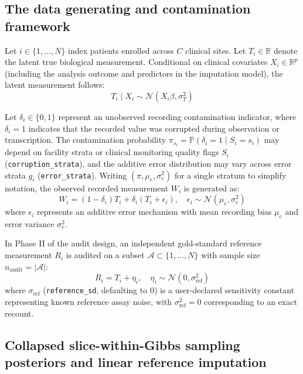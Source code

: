 \documentclass[
]{article}
\begin{document}
\subsection{The data generating and contamination
framework}\label{the-data-generating-and-contamination-framework}

Let \(i \in \{1, \dots, N\}\) index patients enrolled across \(C\)
clinical sites. Let \(T_i \in \mathbb{R}\) denote the latent true
biological measurement. Conditional on clinical covariates
\(X_i \in \mathbb{R}^p\) (including the analysis outcome and predictors
in the imputation model), the latent measurement follows:
\[T_i \mid X_i \sim \mathcal{N}(X_i \beta, \sigma_T^2)\]

Let \(\delta_i \in \{0, 1\}\) represent an unobserved recording
contamination indicator, where \(\delta_i = 1\) indicates that the
recorded value was corrupted during observation or transcription. The
contamination probability
\(\pi_{s_i} = \mathbb{P}(\delta_i = 1 \mid S_i = s_i)\) may depend on
facility strata or clinical monitoring quality flags \(S_i\)
(\texttt{corruption\_strata}), and the additive error distribution may
vary across error strata \(g_i\) (\texttt{error\_strata}). Writing
\((\pi, \mu_e, \sigma_e^2)\) for a single stratum to simplify notation,
the observed recorded measurement \(W_i\) is generated as:
\[W_i = (1 - \delta_i) T_i + \delta_i (T_i + \epsilon_i), \quad \epsilon_i \sim \mathcal{N}(\mu_e, \sigma_e^2)\]
where \(\epsilon_i\) represents an additive error mechanism with mean
recording bias \(\mu_e\) and error variance \(\sigma_e^2\).

In Phase II of the audit design, an independent gold-standard reference
measurement \(R_i\) is audited on a subset
\(\mathcal{A} \subset \{1, \dots, N\}\) with sample size
\(n_{\text{audit}} = |\mathcal{A}|\):
\[R_i = T_i + \eta_i, \quad \eta_i \sim \mathcal{N}(0, \sigma_{\text{ref}}^2)\]
where \(\sigma_{\text{ref}}\) (\texttt{reference\_sd}, defaulting to
\(0\)) is a user-declared sensitivity constant representing known
reference assay noise, with \(\sigma_{\text{ref}}^2 = 0\) corresponding
to an exact recount.

\subsection{Collapsed slice-within-Gibbs sampling posteriors and linear
reference
imputation}\label{collapsed-slice-within-gibbs-sampling-posteriors-and-linear-reference-imputation}
\end{document}
